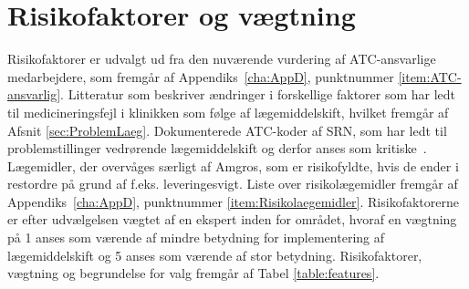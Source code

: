 

\section{Risikofaktorer og vægtning}
Risikofaktorer er udvalgt ud fra den nuværende vurdering af ATC-ansvarlige medarbejdere, som fremgår af Appendiks~\ref{cha:AppD}, punktnummer \ref{item:ATC-ansvarlig}. Litteratur som beskriver ændringer i forskellige faktorer som har ledt til medicineringsfejl i klinikken som følge af lægemiddelskift, hvilket fremgår af Afsnit \ref{sec:ProblemLaeg}. Dokumenterede ATC-koder af SRN, som har ledt til problemstillinger vedrørende lægemiddelskift og derfor anses som kritiske~\citep{SRN}. Lægemidler, der overvåges særligt af Amgros, som er risikofyldte, hvis de ender i restordre på grund af f.eks. leveringesvigt. Liste over risikolægemidler fremgår af Appendiks~\ref{cha:AppD}, punktnummer \ref{item:Risikolaegemidler}. Risikofaktorerne er efter udvælgelsen vægtet af en ekspert inden for området, hvoraf en vægtning på 1 anses som værende af mindre betydning for implementering af lægemiddelskift og 5 anses som værende af stor betydning. Risikofaktorer, vægtning og begrundelse for valg fremgår af Tabel \ref{table:features}.

